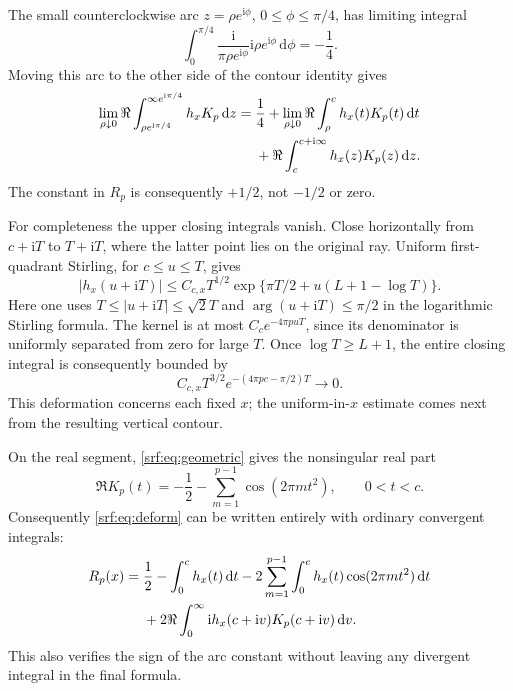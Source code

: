\documentclass[11pt]{article}
\theoremstyle{remark}\newtheorem{remark}[theorem]{Remark}
\newcommand{\ii}{\mathrm i}
\newcommand{\dd}{\,\mathrm d}
\begin{document}
The small counterclockwise arc $z=\rho e^{\ii\phi}$, $0\le\phi\le\pi/4$, has limiting integral
\begin{equation}\label{srf:eq:arc}
 \int_0^{\pi/4}\frac{\ii}{\pi\rho e^{\ii\phi}}
                  \ii\rho e^{\ii\phi}\dd\phi=-\frac14.
\end{equation}
Moving this arc to the other side of the contour identity gives
\begin{align}
 \lim_{\rho\downarrow0}\Re\int_{\rho e^{\ii\pi/4}}^{\infty e^{\ii\pi/4}}
                 h_xK_p\dd z
 ={}&\frac14+\lim_{\rho\downarrow0}\Re\int_\rho^c h_x(t)K_p(t)\dd t\notag\\
    &+\Re\int_{c}^{c+\ii\infty}h_x(z)K_p(z)\dd z.\label{srf:eq:deform}
\end{align}
The constant in $R_p$ is consequently $+1/2$, not $-1/2$ or zero.

For completeness the upper closing integrals vanish. Close horizontally from $c+\ii T$ to $T+\ii T$, where the latter point lies on the original ray. Uniform first-quadrant Stirling, for $c\le u\le T$, gives
\[
 |h_x(u+\ii T)|\le C_{c,x}T^{1/2}
       \exp\{\pi T/2+u(L+1-\log T)\}.
\]
Here one uses $T\le|u+\ii T|\le\sqrt2T$ and $\arg(u+\ii T)\le\pi/2$ in the logarithmic Stirling formula. The kernel is at most $C_ce^{-4\pi puT}$, since its denominator is uniformly separated from zero for large $T$. Once $\log T\ge L+1$, the entire closing integral is consequently bounded by
\[
 C_{c,x}T^{3/2}e^{-(4\pi pc-\pi/2)T}\longrightarrow0.
\]
This deformation concerns each fixed $x$; the uniform-in-$x$ estimate comes next from the resulting vertical contour.

On the real segment, \eqref{srf:eq:geometric} gives the nonsingular real part
\begin{equation}\label{srf:eq:realK}
 \Re K_p(t)=-\frac12-\sum_{m=1}^{p-1}\cos(2\pi mt^2),\qquad 0<t<c.
\end{equation}
Consequently \eqref{srf:eq:deform} can be written entirely with ordinary convergent integrals:
\begin{align}
 R_p(x)={}&\frac12-\int_0^c h_x(t)\dd t
       -2\sum_{m=1}^{p-1}\int_0^c h_x(t)\cos(2\pi mt^2)\dd t\notag\\
       &+2\Re\int_0^\infty \ii h_x(c+\ii v)K_p(c+\ii v)\dd v.\label{srf:eq:Rdeformed}
\end{align}
This also verifies the sign of the arc constant without leaving any divergent integral in the final formula.
\end{document}
